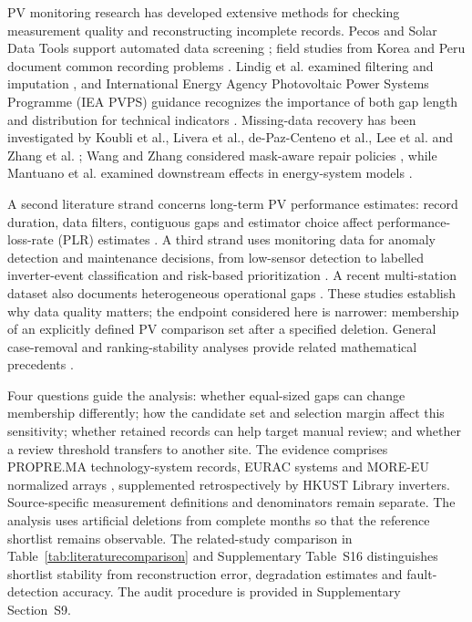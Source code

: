 \documentclass[preprint,12pt]{elsarticle}
\begin{document}
PV monitoring research has developed extensive methods for checking measurement quality and reconstructing incomplete records. Pecos and Solar Data Tools support automated data screening \cite{klise2016,miskovich2025}; field studies from Korea and Peru document common recording problems \cite{choi2022,berastain2022}. Lindig et al. examined filtering and imputation \cite{lindig2020}, and International Energy Agency Photovoltaic Power Systems Programme (IEA PVPS) guidance recognizes the importance of both gap length and distribution for technical indicators \cite{ieapvps2024}. Missing-data recovery has been investigated by Koubli et al., Livera et al., de-Paz-Centeno et al., Lee et al. and Zhang et al. \cite{koubli2016,livera2021,depaz2023,lee2026,zhang2026}; Wang and Zhang considered mask-aware repair policies \cite{wang2026}, while Mantuano et al. examined downstream effects in energy-system models \cite{mantuano2025}.

A second literature strand concerns long-term PV performance estimates: record duration, data filters, contiguous gaps and estimator choice affect performance-loss-rate (PLR) estimates \cite{romero2022,lindig2021,theristis2024,quest2025}. A third strand uses monitoring data for anomaly detection and maintenance decisions, from low-sensor detection to labelled inverter-event classification and risk-based prioritization \cite{laguna2024,miraftab2025,liu2025,severiano2026,questfault2025,tang2026,ieaom2022}. A recent multi-station dataset also documents heterogeneous operational gaps \cite{daskalov2026}. These studies establish why data quality matters; the endpoint considered here is narrower: membership of an explicitly defined PV comparison set after a specified deletion. General case-removal and ranking-stability analyses provide related mathematical precedents \cite{alzhrani2026,giordano2026,yang2023,liang2025}.

Four questions guide the analysis: whether equal-sized gaps can change membership differently; how the candidate set and selection margin affect this sensitivity; whether retained records can help target manual review; and whether a review threshold transfers to another site. The evidence comprises PROPRE.MA technology-system records, EURAC systems and MORE-EU normalized arrays \cite{bennouna2019,eurac2026,moreeu2026}, supplemented retrospectively by HKUST Library inverters. Source-specific measurement definitions and denominators remain separate. The analysis uses artificial deletions from complete months so that the reference shortlist remains observable. The related-study comparison in Table~\ref{tab:literaturecomparison} and Supplementary Table~S16 distinguishes shortlist stability from reconstruction error, degradation estimates and fault-detection accuracy. The audit procedure is provided in Supplementary Section~S9.
\end{document}
